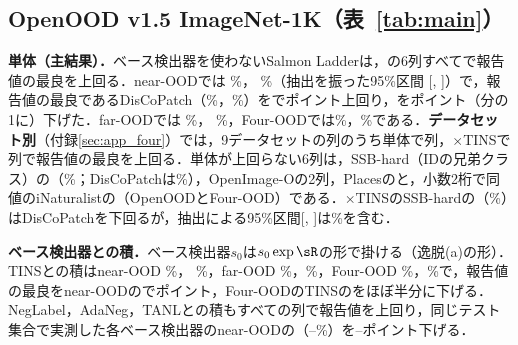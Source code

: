 \subsection{OpenOOD v1.5 ImageNet-1K（表~\ref{tab:main}）}
\label{sec:main}
\textbf{単体（主結果）．}ベース検出器を使わないSalmon Ladderは，の6列すべてで報告値の最良を上回る．near-OODでは\AUC{} \NRAloneNearAuroc\%，\FPR{} \NRAloneNearFpr\%（抽出を振った95\%区間 [\NRAloneNearFprLo, \NRAloneNearFprHi]）で，報告値の最良であるDisCoPatch（\NBestOtherNearAuroc\%，\NBestOtherNearFpr\%）を\AUC{}で\NRAloneGapNearAuroc{}ポイント上回り，\FPR{}を\NRAloneGapNearFpr{}ポイント（\NRAloneNearFprRatio{}分の1に）下げた．far-OODでは\AUC{} \NRAloneFarAuroc\%，\FPR{} \NRAloneFarFpr\%，Four-OODでは\NRAloneFourAuroc\%，\NRAloneFourFpr\%である．\textbf{データセット別}（付録\ref{sec:app_four}）では，9データセットの\NRPerdsCols{}列のうち単体で\NRPerdsWinsAlone{}列，$\times$TINSで\NRPerdsWinsTins{}列で報告値の最良を上回る．単体が上回らない6列は，SSB-hard（IDの兄弟クラス）の\FPR{}（\NRAloneSsbHardFpr\%；DisCoPatchは\NRDiscoSsbHardFpr\%），OpenImage-Oの2列，Placesの\AUC{}と，小数2桁で同値のiNaturalistの\AUC{}（OpenOODとFour-OOD）である．$\times$TINSのSSB-hardの\FPR{}（\NRTinsSsbHardFpr\%）はDisCoPatchを下回るが，抽出による95\%区間[\NRTinsSsbHardFprLo, \NRTinsSsbHardFprHi]は\NRDiscoSsbHardFpr\%を含む．

\textbf{ベース検出器との積．}ベース検出器$s_0$は$s_0\exp\sR$の形で掛ける（逸脱(a)の形）．TINSとの積はnear-OOD \AUC{} \NRTinsNearAuroc\%，\FPR{} \NRTinsNearFpr\%，far-OOD \NRTinsFarAuroc\%，\NRTinsFarFpr\%，Four-OOD \NRTinsFourAuroc\%，\NRTinsFourFpr\%で，報告値の最良をnear-OODの\FPR{}で\NRTinsGapNearFpr{}ポイント，Four-OODのTINSの\FPR{}をほぼ半分に下げる．NegLabel，AdaNeg，TANLとの積もすべての列で報告値を上回り，同じテスト集合で実測した各ベース検出器のnear-OODの\FPR{}（\NRMeasTINSNearFpr--\NRMeasNegLabelNearFpr\%）を\NRGainTANLNearFpr--\NRGainNegLabelNearFpr{}ポイント下げる．

\begin{table}[t]
\centering
\caption{OpenOOD v1.5 ImageNet-1KとFour-OOD（[\%]）．$\dagger$は原論文の報告値（近／遠の平均は本稿で計算）．実測値は同じテスト集合での値（到着順の平均，）．本手法は$\sR$，抽出6通りの平均（$\times$ベース検出器の行は順序の平均も取る）．\textcolor{sotacol}{$\bigstar$}は列の最良値，\colorbox{upd}{青}は比較手法のすべてを上回る値，括弧の行は最良の比較手法との差（正は本手法が良い）．}
\label{tab:main}
\vspace{0.5mm}

\end{table}

